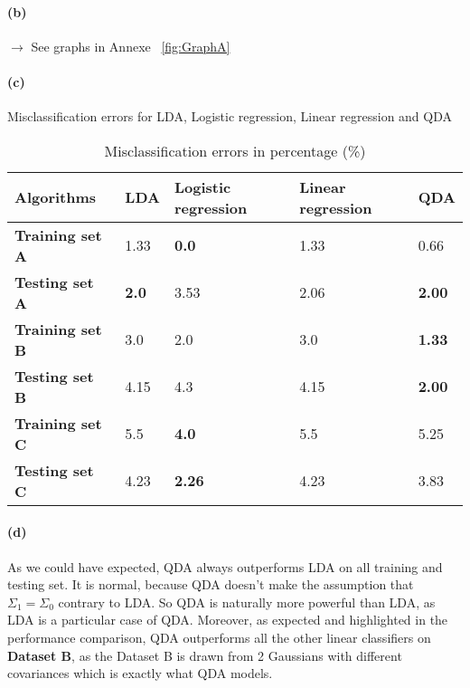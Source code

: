 \documentclass[11pt]{article}
\numberwithin{figure}{section} %
\begin{document}
\paragraph{(b)}
$\rightarrow$ See graphs in Annexe ~\ref{fig:GraphA}

\paragraph{(c)} Misclassification errors for LDA, Logistic regression, Linear regression and QDA
\begin{table}[H]
\centering
\begin{tabular}{@{}lllll@{}}
\toprule
\rowcolor[HTML]{EFEFEF} 
{\color[HTML]{000000} \textbf{Algorithms}} & {\color[HTML]{000000} \textbf{LDA}} & {\color[HTML]{000000} \textbf{Logistic regression}} & {\color[HTML]{000000} \textbf{Linear regression}} & \textbf{QDA} \\ \midrule
\rowcolor[HTML]{FFFFFF} 
\textbf{Training set A} & 1.33 & \textbf{0.0} & 1.33 & 0.66 \\
\rowcolor[HTML]{FFFFFF} 
\textbf{Testing set A} & \textbf{2.0} & 3.53 & 2.06 & \textbf{2.00} \\ \midrule
\rowcolor[HTML]{FFFFFF} 
{\color[HTML]{333333} \textbf{Training set B}} & {\color[HTML]{333333} 3.0} & {\color[HTML]{333333} 2.0} & {\color[HTML]{333333} 3.0} & \textbf{1.33} \\
\rowcolor[HTML]{FFFFFF} 
{\color[HTML]{333333} \textbf{Testing set B}} & {\color[HTML]{333333} 4.15} & {\color[HTML]{333333} 4.3} & {\color[HTML]{333333} 4.15} & \textbf{2.00} \\ \midrule
\rowcolor[HTML]{FFFFFF} 
\textbf{Training set C} & 5.5 & \textbf{4.0} & 5.5 & 5.25 \\
\rowcolor[HTML]{FFFFFF} 
\textbf{Testing set C} & 4.23 & \textbf{2.26} & 4.23 & 3.83 \\ \bottomrule
\end{tabular}
\caption{Misclassification errors in percentage (\%)}
\label{Models performance including QDA}
\end{table}

\paragraph{(d)}
As we could have expected, QDA always outperforms LDA on all training and testing set. It is normal, because QDA doesn't make the assumption that $\Sigma_1 = \Sigma_0$ contrary to LDA. So QDA is naturally more powerful than LDA, as LDA is a particular case of QDA. Moreover, as expected and highlighted in the performance comparison, QDA outperforms all the other linear classifiers on \textbf{Dataset B}, as the Dataset B is drawn from 2 Gaussians with different covariances which is exactly what QDA models.
\end{document}
